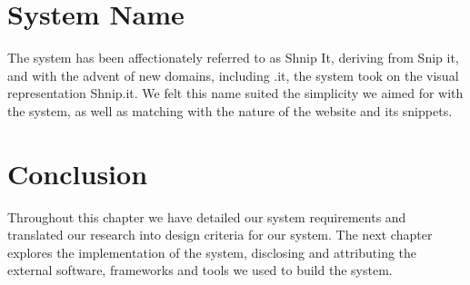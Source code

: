 \section{System Name}
The system has been affectionately referred to as Shnip It, deriving from Snip it, and with the advent of new domains, including .it, the system took on the visual representation Shnip.it.
We felt this name suited the simplicity we aimed for with the system, as well as matching with the nature of the website and its snippets.

\section{Conclusion} \label{reqconclusion}
Throughout this chapter we have detailed our system requirements and translated our research into design criteria for our system.
The next chapter explores the implementation of the system, disclosing and attributing the external software, frameworks and tools we used to build the system.

